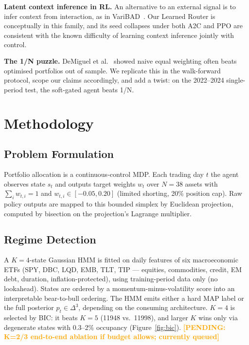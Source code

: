 \documentclass[sigconf,anonymous,review]{acmart}
\newcommand{\pending}[1]{\textcolor{orange}{\textbf{[PENDING: #1]}}}
\begin{document}
\textbf{Latent context inference in RL.}
An alternative to an external signal is to infer context from interaction,
as in VariBAD~\cite{zintgraf2020varibad}. Our Learned Router is
conceptually in this family, and its seed collapses under both A2C and PPO
are consistent with the known difficulty of learning context inference
jointly with control.

\textbf{The 1/N puzzle.}
DeMiguel et al.~\cite{demiguel2009} showed naive equal weighting often
beats optimised portfolios out of sample. We replicate this in the
walk-forward protocol, scope our claims accordingly, and add a twist: on
the 2022--2024 single-period test, the soft-gated agent beats 1/N.

\section{Methodology}

\subsection{Problem Formulation}
Portfolio allocation is a continuous-control MDP. Each trading day $t$ the
agent observes state $s_t$ and outputs target weights $w_t$ over $N{=}38$
assets with $\sum_i w_{t,i}=1$ and $w_{t,i}\in[-0.05,0.20]$ (limited
shorting, 20\% position cap). Raw policy outputs are mapped to this
bounded simplex by Euclidean projection, computed by bisection on the
projection's Lagrange multiplier.

\subsection{Regime Detection}
A $K{=}4$-state Gaussian HMM is fitted on daily features of six
macroeconomic ETFs (SPY, DBC, LQD, EMB, TLT, TIP --- equities,
commodities, credit, EM debt, duration, inflation-protected), using
training-period data only (no lookahead). States are ordered by a
momentum-minus-volatility score into an interpretable bear-to-bull
ordering. The HMM emits either a hard MAP label or the full posterior
$p_t\in\Delta^3$, depending on the consuming architecture.
$K{=}4$ is selected by BIC: it beats $K{=}5$ (11948 vs.\ 11998), and
larger $K$ wins only via degenerate states with 0.3--2\% occupancy
(Figure~\ref{fig:bic}). \pending{K=2/3 end-to-end ablation if budget
allows; currently queued}
\end{document}
